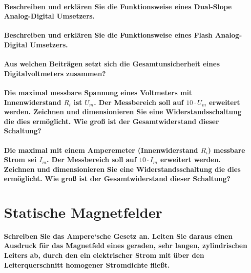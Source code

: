 \documentclass[a4paper, 11pt, parskip=half]{scrartcl}
\begin{document}
\paragraph{Beschreiben und erklären Sie die Funktionsweise eines Dual-Slope Analog-Digital
Umsetzers.}

\paragraph{Beschreiben und erklären Sie die Funktionsweise eines Flash Analog-Digital Umsetzers.}

\paragraph{Aus welchen Beiträgen setzt sich die Gesamtunsicherheit eines Digitalvoltmeters
zusammen?}

\paragraph{Die maximal messbare Spannung eines Voltmeters mit Innenwiderstand $R_i$ ist $U_m$. Der
Messbereich soll auf $10 \cdot U_m$ erweitert werden. Zeichnen und dimensionieren Sie eine
Widerstandsschaltung die dies ermöglicht. Wie groß ist der Gesamtwiderstand dieser Schaltung?}

\paragraph{Die maximal mit einem Amperemeter (Innenwiderstand $R_i$) messbare Strom sei $I_m$. Der
Messbereich soll auf $10 \cdot I_m$ erweitert werden. Zeichnen und dimensionieren Sie eine
Widerstandsschaltung die dies ermöglicht. Wie groß ist der Gesamtwiderstand dieser Schaltung?}

\newpage

\section{Statische Magnetfelder}

\paragraph{Schreiben Sie das Ampere‘sche Gesetz an. Leiten Sie daraus einen Ausdruck für das
Magnetfeld eines geraden, sehr langen, zylindrischen Leiters ab, durch den ein elektrischer Strom
mit über den Leiterquerschnitt homogener Stromdichte fließt.}
\end{document}
